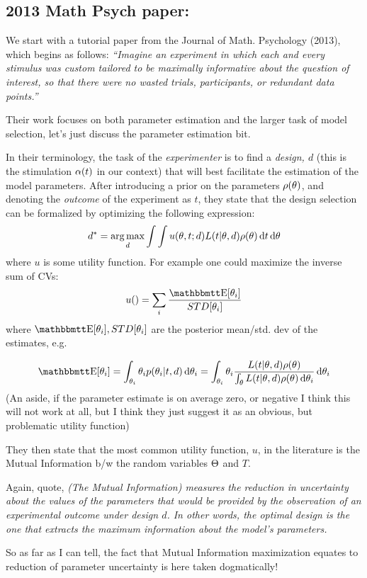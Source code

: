 \documentclass{article}
\begin{document}
\subsection{2013 Math Psych paper: \cite{Myung2013}}
We start with a tutorial paper from the Journal of Math. Psychology (2013),
which begins as follows: { \sl ``Imagine an experiment in which each and every
stimulus was custom tailored to be maximally informative about the question of
interest, so that there were no wasted trials, participants, or redundant data
points.''} 

Their work focuses on both parameter estimation and the larger task of model
selection, let's just discuss the parameter estimation bit. 

In their terminology, the task of the {\sl experimenter}
 is to find a { \sl design, $d$ } (this is the stimulation ${\alpha}(t)$ in our
 context) that will best facilitate the estimation of the model parameters.
 After introducing a prior on the parameters $\rho({\theta})$, and denoting the
 {\sl outcome} of the experiment as $t$, they state that the design selection
 can be formalized by optimizing the following expression: $$
d^* =  \argmax_d \int \int u(\th, t; d) L(t| \th, d) \rho (\th) \intd{t}
\intd{\th}
$$
where $u$ is some utility function. For example one could maximize the inverse
sum of CVs:
$$
u() = \sum_i \frac{\Exp[\th_i]}{STD[\th_i]}
$$
where 
$\Exp[\th_i], STD[\th_i]$ are the posterior mean/std. dev of the estimates, e.g.

$$
\Exp[\th_i] = \int_{\th_i} \th_i p(\th_i| t, d) \intd{\th_i} = 
\int_{\th_i} \th_i \frac{ L(t| \th, d) \rho (\th) }
					    {\int_\th L(t| \th, d) \rho (\th)\intd{\th_i} } \intd{\th_i} 
$$
(An aside, if the parameter estimate is on average zero, or negative I think
this will not work at all, but I think they just suggest it as an obvious, but
problematic utility function)

They then state that the most common utility function, $u$, in the
literature is the Mutual Information b/w the random variables ${\Theta}$ and $T$. 

Again, quote, {\sl (The Mutual Information)  measures the reduction in
uncertainty about the values of the parameters that would be provided by the
observation of an experimental outcome under design $d$. In other words, the
optimal design is the one that extracts the maximum information about the
model's parameters.}

So as far as I can tell, the fact that Mutual Information maximization equates
to reduction of parameter uncertainty is here taken dogmatically!
\end{document}
